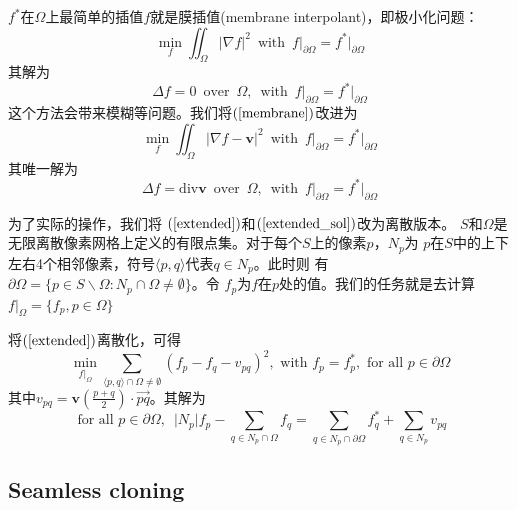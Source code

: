 \documentclass{article}
\begin{document}
	$f^*$在$\Omega$上最简单的插值$f$就是膜插值(membrane interpolant)，即极小化问题：
	\begin{equation}\label{membrane}
		\min_f\iint_{\Omega}\vert\nabla f\vert^2\enspace\text{with}\enspace 
		f\vert_{\partial\Omega}=f^*\vert_{\partial\Omega}
	\end{equation}
	其解为
	\begin{equation}\label{membrane_sol}
		\Delta f=0\enspace\text{over}\enspace\Omega,\enspace\text{with}\enspace 
		f\vert_{\partial\Omega}=f^*\vert_{\partial\Omega}
	\end{equation}
	这个方法会带来模糊等问题。我们将$(\ref{membrane})$改进为
	\begin{equation}\label{extended}
		\min_f\iint_{\Omega}
		\vert\nabla f-\mathbf{v}\vert^2\enspace\text{with}\enspace 
		f\vert_{\partial\Omega}=f^*\vert_{\partial\Omega}
	\end{equation}
	其唯一解为
	\begin{equation}\label{extended_sol}
		\Delta f=\text{div}\mathbf{v}\enspace\text{over}\enspace\Omega,
		\enspace\text{with}\enspace 
		f\vert_{\partial\Omega}=f^*\vert_{\partial\Omega}
	\end{equation}

	为了实际的操作，我们将
	$(\ref{extended})$和$(\ref{extended_sol})$改为离散版本。
	$S$和$\Omega$是无限离散像素网格上定义的有限点集。对于每个$S$上的像素$p$，$N_p$为
	$p$在$S$中的上下左右4个相邻像素，符号$\langle p,q\rangle$代表$q\in N_p$。此时则
	有$\partial\Omega=\{p\in S\backslash\Omega:N_p\cap\Omega\neq\emptyset\}$。令
	$f_p$为$f$在$p$处的值。我们的任务就是去计算$f\vert_{\Omega}=\{f_p,p\in\Omega\}$
	
	将$(\ref{extended})$离散化，可得
	\begin{equation}\label{discrete}
		\min_{f\vert_{\Omega}}
		\sum_{\langle p,q\rangle\cap\Omega\neq\emptyset}
		(f_p-f_q-v_{pq})^2,\text{ with }f_p=f_p^*,\text{ for all 
		}p\in\partial\Omega
	\end{equation}
	其中$v_{pq}=\textbf{v}(\frac{p+q}{2})\cdot\overrightarrow{pq}$。其解为
	\begin{equation}\label{discrete_sol}
		\text{ for all }p\in\partial\Omega,\enspace\vert N_p\vert 
		f_p-\sum_{q\in N_p\cap\Omega}f_q=\sum_{q\in N_p\cap\partial\Omega}f_q^*
		+\sum_{q\in N_p}v_{pq}
	\end{equation}

	\subsection{Seamless cloning}
\end{document}
